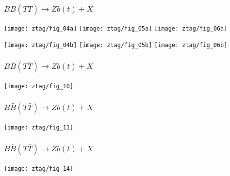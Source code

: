 \documentclass[xcolor=dvipsnames,10pt]{beamer}
\begin{document}
\begin{frame}\frametitle{$B\bar{B}(T\bar{T})\to Zb(t)+X$~\cite{ATLAS-CONF-2013-056}}
\footnotesize\centering

       \texttt{[image: ztag/fig\_04a]}
       \texttt{[image: ztag/fig\_05a]}
       \texttt{[image: ztag/fig\_06a]}


       \texttt{[image: ztag/fig\_04b]}
       \texttt{[image: ztag/fig\_05b]}
       \texttt{[image: ztag/fig\_06b]}

\end{frame}

\begin{frame}\frametitle{$B\bar{B}(T\bar{T})\to Zb(t)+X$~\cite{ATLAS-CONF-2013-056}}
\footnotesize\centering

       \texttt{[image: ztag/fig\_10]}

\end{frame}


\begin{frame}\frametitle{$B\bar{B}(T\bar{T})\to Zb(t)+X$~\cite{ATLAS-CONF-2013-056}}
\footnotesize\centering

       \texttt{[image: ztag/fig\_11]}

\end{frame}


\begin{frame}\frametitle{$B\bar{B}(T\bar{T})\to Zb(t)+X$~\cite{ATLAS-CONF-2013-056}}
\footnotesize\centering

       \texttt{[image: ztag/fig\_14]}

\end{frame}
\end{document}
